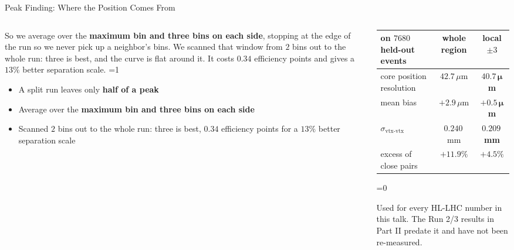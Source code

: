 \documentclass[xcolor=table,aspectratio=169]{beamer}
\newcommand{\pvcap}[1]{{\scriptsize\textcolor{black!55}{#1}}}
\providecommand{\talkbuild}{0}
\newcommand{\readingonly}[1]{\ifnum\talkbuild=0\relax#1\fi}
\newcommand{\talkonly}[1]{\ifnum\talkbuild=1\relax#1\fi}
\begin{document}
\begin{frame}{Peak Finding: Where the Position Comes From}
\begin{columns}[t]
\begin{column}{0.52\linewidth}
{            So we average over the \textbf{maximum bin and three bins on each
            side}, stopping at the edge of the run so we never pick up a
            neighbor's bins. We scanned that window from $2$ bins out to the whole
            run: three is best, and the curve is flat around it. It
            costs $0.34$ efficiency points and gives a $13\%$ better separation scale.}%
            \talkonly{\begin{itemize}\setlength\itemsep{0.4em}
                \item A split run leaves only \textbf{half of a peak}
                \item Average over the \textbf{maximum bin and three bins on each side}
                \item Scanned $2$ bins out to the whole run: three is best,
                    $0.34$ efficiency points for a $13\%$ better separation scale
            \end{itemize}}
        \end{column}
        \begin{column}{0.48\linewidth}
            \centering
            \scriptsize
            \setlength{\tabcolsep}{4pt}
            \begin{tabular}{lcc}
                \toprule
                on $7680$ held-out events & whole region & \textbf{local $\pm3$} \\
                \midrule
                core position resolution   & $42.7\,\mu$m & $\mathbf{40.7\,\mu}$\textbf{m} \\
                mean bias                  & $+2.9\,\mu$m & $\mathbf{+0.5\,\mu}$\textbf{m} \\
                $\sigma_{\text{vtx-vtx}}$  & $0.240$\,mm  & $\mathbf{0.209}$\,\textbf{mm} \\
                excess of close pairs      & $+11.9\%$    & $\mathbf{+4.5\%}$ \\
                \bottomrule
            \end{tabular}
            \readingonly{\vspace{0.6em}

            \raggedright
            \pvcap{Used for every HL-LHC number in this talk. The Run 2/3 results in
            Part II predate it and have not been re-measured.}}
        \end{column}
    \end{columns}
\end{frame}
\end{document}
